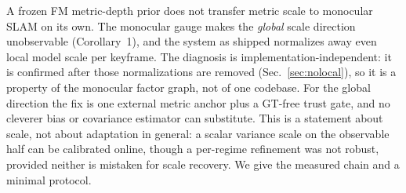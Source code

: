 A frozen FM metric-depth prior does not transfer metric scale to monocular SLAM
on its own. The monocular gauge makes the \emph{global} scale direction
unobservable (Corollary~1), and the system as shipped normalizes away even local
model scale per keyframe. The diagnosis is implementation-independent: it is
confirmed after those normalizations are removed (Sec.~\ref{sec:nolocal}), so it is a property of
the monocular factor graph, not of one codebase. For the global direction the fix
is one external metric
anchor plus a GT-free trust gate, and no cleverer bias or covariance estimator can
substitute. This is a statement about scale, not about adaptation in general: a
scalar variance scale on the observable half can be calibrated online, though a
per-regime refinement was not robust, provided neither is mistaken for scale
recovery. We give the measured chain and a minimal protocol.

